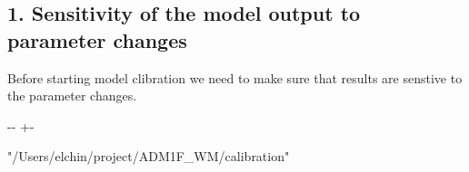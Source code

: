 \documentclass[a4paper,10pt,english]{sphinxmanual}
\newlength\nbsphinxcodecellspacing
\begin{document}
\subsection{1. Sensitivity of the model output to parameter changes}
\label{\detokenize{jupyter_notebook/parameter-calibration:1.-Sensitivity-of-the-model-output-to-parameter-changes}}
\sphinxAtStartPar
Before starting model clibration we need to make sure that results are senstive to the parameter changes.

{
\begin{sphinxVerbatim}[commandchars=\\\{\}]
\llap{\color{nbsphinxin}[2]:\,\hspace{\fboxrule}\hspace{\fboxsep}} 
 
 
\end{sphinxVerbatim}
}

{
\begin{sphinxVerbatim}[commandchars=\\\{\}]
\llap{\color{nbsphinxin}[3]:\,\hspace{\fboxrule}\hspace{\fboxsep}}
\end{sphinxVerbatim}
}

{

\kern-\sphinxverbatimsmallskipamount\kern-\baselineskip
\kern+\FrameHeightAdjust\kern-\fboxrule
\vspace{\nbsphinxcodecellspacing}

\begin{sphinxVerbatim}[commandchars=\\\{\}]
\llap{\color{nbsphinxout}[3]:\,\hspace{\fboxrule}\hspace{\fboxsep}}"/Users/elchin/project/ADM1F\_WM/calibration"
\end{sphinxVerbatim}
}
\end{document}
